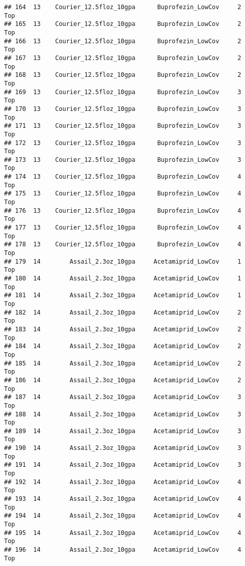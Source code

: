 \documentclass[
]{article}
\begin{document}
\begin{verbatim}
## 164  13    Courier_12.5floz_10gpa      Buprofezin_LowCov     2           Top
## 165  13    Courier_12.5floz_10gpa      Buprofezin_LowCov     2           Top
## 166  13    Courier_12.5floz_10gpa      Buprofezin_LowCov     2           Top
## 167  13    Courier_12.5floz_10gpa      Buprofezin_LowCov     2           Top
## 168  13    Courier_12.5floz_10gpa      Buprofezin_LowCov     2           Top
## 169  13    Courier_12.5floz_10gpa      Buprofezin_LowCov     3           Top
## 170  13    Courier_12.5floz_10gpa      Buprofezin_LowCov     3           Top
## 171  13    Courier_12.5floz_10gpa      Buprofezin_LowCov     3           Top
## 172  13    Courier_12.5floz_10gpa      Buprofezin_LowCov     3           Top
## 173  13    Courier_12.5floz_10gpa      Buprofezin_LowCov     3           Top
## 174  13    Courier_12.5floz_10gpa      Buprofezin_LowCov     4           Top
## 175  13    Courier_12.5floz_10gpa      Buprofezin_LowCov     4           Top
## 176  13    Courier_12.5floz_10gpa      Buprofezin_LowCov     4           Top
## 177  13    Courier_12.5floz_10gpa      Buprofezin_LowCov     4           Top
## 178  13    Courier_12.5floz_10gpa      Buprofezin_LowCov     4           Top
## 179  14        Assail_2.3oz_10gpa     Acetamiprid_LowCov     1           Top
## 180  14        Assail_2.3oz_10gpa     Acetamiprid_LowCov     1           Top
## 181  14        Assail_2.3oz_10gpa     Acetamiprid_LowCov     1           Top
## 182  14        Assail_2.3oz_10gpa     Acetamiprid_LowCov     2           Top
## 183  14        Assail_2.3oz_10gpa     Acetamiprid_LowCov     2           Top
## 184  14        Assail_2.3oz_10gpa     Acetamiprid_LowCov     2           Top
## 185  14        Assail_2.3oz_10gpa     Acetamiprid_LowCov     2           Top
## 186  14        Assail_2.3oz_10gpa     Acetamiprid_LowCov     2           Top
## 187  14        Assail_2.3oz_10gpa     Acetamiprid_LowCov     3           Top
## 188  14        Assail_2.3oz_10gpa     Acetamiprid_LowCov     3           Top
## 189  14        Assail_2.3oz_10gpa     Acetamiprid_LowCov     3           Top
## 190  14        Assail_2.3oz_10gpa     Acetamiprid_LowCov     3           Top
## 191  14        Assail_2.3oz_10gpa     Acetamiprid_LowCov     3           Top
## 192  14        Assail_2.3oz_10gpa     Acetamiprid_LowCov     4           Top
## 193  14        Assail_2.3oz_10gpa     Acetamiprid_LowCov     4           Top
## 194  14        Assail_2.3oz_10gpa     Acetamiprid_LowCov     4           Top
## 195  14        Assail_2.3oz_10gpa     Acetamiprid_LowCov     4           Top
## 196  14        Assail_2.3oz_10gpa     Acetamiprid_LowCov     4           Top

\end{verbatim}
\end{document}
